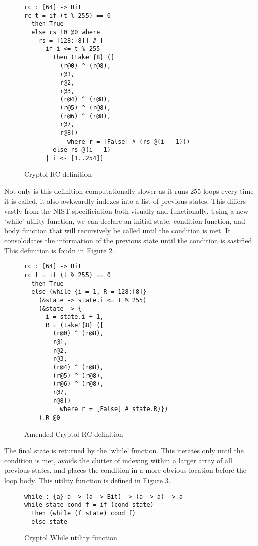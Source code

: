 \begin{figure}[h]
  \centering
\begin{lstlisting}[language=Cryptol]
rc : [64] -> Bit
rc t = if (t % 255) == 0 
  then True 
  else rs !0 @0 where
    rs = [128:[8]] # [
      if i <= t % 255
        then (take'{8} ([
          (r@0) ^ (r@8),
          r@1,
          r@2,
          r@3, 
          (r@4) ^ (r@8),
          (r@5) ^ (r@8),
          (r@6) ^ (r@8),
          r@7,
          r@8])
            where r = [False] # (rs @(i - 1)))
        else rs @(i - 1)
      | i <- [1..254]]
\end{lstlisting}
\caption{Cryptol RC definition}
\label{fig:cryptolRC}
\end{figure}

Not only is this definition computationally slower as it runs 255 loops every time it is called, 
it also awkwardly indexes into a list of previous states. This differs vastly from the 
NIST specificiation both visually and functionally. Using a new ‘while’ utility function, we 
can declare an initial state, condition function, and body function that will recursively 
be called until the condition is met. It consolodates the information of the previous state 
until the condition is sastified. This definition is foudn in Figure \ref{fig:cryptolamendedRC}.

\begin{figure}[h]
  \centering
\begin{lstlisting}[language=Cryptol]
rc : [64] -> Bit
rc t = if (t % 255) == 0 
  then True 
  else (while {i = 1, R = 128:[8]}
    (&state -> state.i <= t % 255)
    (&state -> {
      i = state.i + 1, 
      R = (take'{8} ([
        (r@0) ^ (r@8),
        r@1,
        r@2,
        r@3,
        (r@4) ^ (r@8),
        (r@5) ^ (r@8),
        (r@6) ^ (r@8),
        r@7, 
        r@8]) 
          where r = [False] # state.R)})
    ).R @0
\end{lstlisting}
\caption{Amended Cryptol RC definition}
\label{fig:cryptolamendedRC}
\end{figure}

The final state is returned by the ‘while’ function. This iterates only until the 
condition is met, avoids the clutter of indexing within a larger array of all previous 
states, and places the condition in a more obvious location before the loop body. This 
utility function is defined in Figure \ref{fig:cryptolWhile}.

\begin{figure}[h]
  \centering
\begin{lstlisting}[language=Cryptol]
while : {a} a -> (a -> Bit) -> (a -> a) -> a
while state cond f = if (cond state)
  then (while (f state) cond f)	
  else state
\end{lstlisting}
\caption{Cryptol While utility function}
\label{fig:cryptolWhile}
\end{figure}
